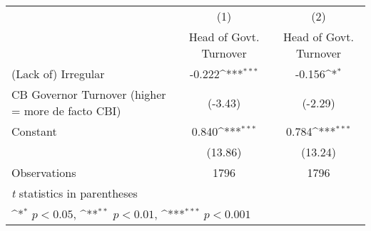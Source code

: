 {
\def\sym#1{\ifmmode^{#1}\else\(^{#1}\)\fi}
\begin{tabular}{l*{2}{c}}
\hline\hline
                    &\multicolumn{1}{c}{(1)}&\multicolumn{1}{c}{(2)}\\
                    &\multicolumn{1}{c}{Head of Govt. Turnover}&\multicolumn{1}{c}{Head of Govt. Turnover}\\
\hline
(Lack of) Irregular &      -0.222\sym{***}&      -0.156\sym{*}  \\
CB Governor Turnover (higher = more de facto CBI)&     (-3.43)         &     (-2.29)         \\
[1em]
Constant            &       0.840\sym{***}&       0.784\sym{***}\\
                    &     (13.86)         &     (13.24)         \\
\hline
Observations        &        1796         &        1796         \\
\hline\hline
\multicolumn{3}{l}{\footnotesize \textit{t} statistics in parentheses}\\
\multicolumn{3}{l}{\footnotesize \sym{*} \(p<0.05\), \sym{**} \(p<0.01\), \sym{***} \(p<0.001\)}\\
\end{tabular}
}
